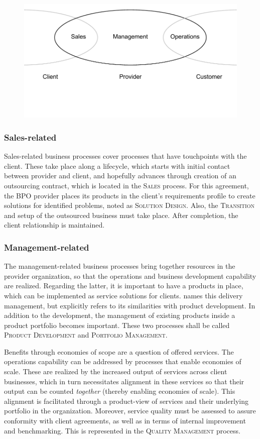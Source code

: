 	
	\begin{figure}[caption={BPO Chain Provider Scope with Stakeholders}, label={fig:bpochainscope}]
		{	\includegraphics[width=.8\textwidth]{figures/chain2.pdf}}
	\end{figure} 
	
	\subsubsection{Sales-related}
	Sales-related business processes cover processes that have touchpoints with the client. These take place along a lifecycle, which starts with initial contact between provider and client, and hopefully advances through creation of an outsourcing contract, which is located in the \textsc{Sales} process. For this agreement, the \acrshort{BPO} provider places its products in the client's requirements profile to create solutions for identified problems, noted as \textsc{Solution Design}. Also, the \textsc{Transition} and setup of the outsourced business must take place. After completion, the client relationship is maintained.
	
	\subsubsection{Management-related}
	The management-related business processes bring together resources in the provider organization, so that the operations and business development capability are realized. Regarding the latter, it is important to have a products in place, which can be implemented as service solutions for clients. \cite{schewe2007} names this delivery management, but explicitly refers to its similarities with product development. In addition to the development, the management of existing products inside a product portfolio becomes important. These two processes shall be called \textsc{Product Development} and \textsc{Portfolio Management}.
	
	Benefits through economies of scope are a question of offered services. The operations capability can be addressed by processes that enable economies of scale. These are realized by the increased output of services across client businesses, which in turn necessitates alignment in these services so that their output can be counted \textit{together} (\eg thereby enabling economies of scale). This alignment is facilitated through a product-view of services and their underlying portfolio in the organization. Moreover, service quality must be assessed to assure conformity with client agreements, as well as in terms of internal improvement and benchmarking. This is represented in the \textsc{Quality Management} process. 
	
